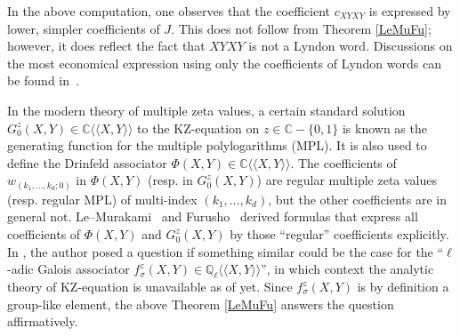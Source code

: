 \documentclass[ALCO,Unicode,published]{cedram}
\def\C{{\mathbb C}}
\def\Q{{\mathbb Q}}
\def\la{\langle}
\def\ra{\rangle}
\def\lala{\la\!\la}
\def\rara{\ra\!\ra}
\begin{document}
\begin{Example}
In the above computation, one observes that the coefficient $c_{XYXY}$
is expressed by lower, simpler coefficients of $J$. This does not follow 
from Theorem \ref{LeMuFu}; however, it does reflect the fact 
that $XYXY$ is not a Lyndon word.
Discussions on the most economical expression using only the 
coefficients of Lyndon words can be found in~\cite{MPH}. 
\end{Example}

\begin{Note}
In the modern theory of multiple zeta values, a certain standard solution 
$G_0^z(X,Y)\in \C\lala X,Y\rara$ to the KZ-equation on $z\in \C-\{0,1\}$
is known as the generating function for the multiple polylogarithms (MPL).
It is also used to define the Drinfeld associator $\Phi(X,Y) \in\C\lala X,Y\rara$.  
The coefficients of $w_{(k_1,\dots,k_d;0)}$ in $\Phi(X,Y)$ (resp. in $G_0^z(X,Y)$)
are regular multiple zeta values (resp. regular MPL) of multi-index $(k_1,\dots,k_d)$,
but the other coefficients are in general not.  
Le--Murakami~\cite{LM} and Furusho~\cite{F} derived formulas that express
all coefficients of $\Phi(X,Y)$ and $G_0^z(X,Y)$ by those ``regular'' coefficients
explicitly. 
In \cite[Remark 2]{N21}, the author posed a question if something similar could be the
case for the ``$\ell$-adic Galois associator $f_\sigma^z(X,Y)\in\Q_\ell\lala X,Y\rara$'',
in which context the analytic theory of KZ-equation is unavailable as of yet. 
Since $f_\sigma^z(X,Y)$ is by definition a group-like element, 
the above Theorem \ref{LeMuFu} answers the question affirmatively.
\end{Note}
\end{document}
